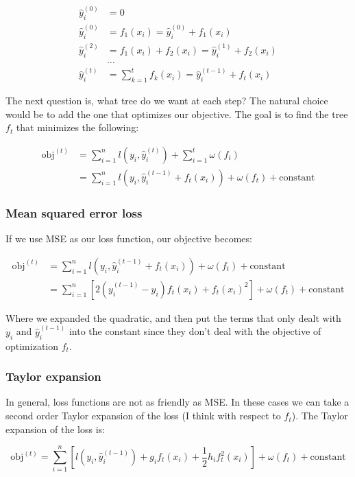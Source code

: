 \documentclass[12 pt, leqno]{article}
\begin{document}
\begin{align*}
\hat{y}^{(0)}_i &= 0 \\
\hat{y}^{(0)}_i &= f_1(x_i) = \hat{y}^{(0)}_i + f_1(x_i) \\
\hat{y}^{(2)}_i &= f_1(x_i) + f_2(x_i) = \hat{y}^{(1)}_i + f_2(x_i) \\
& \dots \\ 
\hat{y}^{(t)}_i &= \sum_{k = 1}^t f_k(x_i)  = \hat{y}^{(t - 1)}_i + f_t(x_i)
\end{align*}

The next question is, what tree do we want at each step? The natural choice would be to add the one that optimizes our objective. The goal is to find the tree $f_t$ that minimizes the following:

\begin{align*}
\text{obj}^{(t)} &= \sum_{i = 1} ^n l(y_i, \hat{y}^{(t)}_i) + \sum_{i = 1}^t \omega(f_i) \\ 
&= \sum_{i = 1} ^n l(y_i, \hat{y}^{(t-1)}_i + f_t(x_i)) + \omega(f_t) + \text{constant} 
\end{align*}

\subsubsection{Mean squared error loss}

If we use MSE as our loss function, our objective becomes:

\begin{align*}
\text{obj}^{(t)} &= \sum_{i = 1} ^n l(y_i, \hat{y}^{(t-1)}_i + f_t(x_i)) + \omega(f_t) + \text{constant} \\
&= \sum_{i = 1}^n [ 2(y_i^{(t-1)} - y_i) f_t (x_i) + f_t (x_i)^2 ] + \omega(f_t) + \text{constant}
\end{align*}

Where we expanded the quadratic, and then put the terms that only dealt with $y_i$ and $\hat{y}_i^{(t-1)}$ into the constant since they don't deal with the objective of optimization $f_t$.

\subsubsection{Taylor expansion}

In general, loss functions are not as friendly as MSE. In these cases we can take a second order Taylor expansion of the loss (I think with respect to $f_t$). The Taylor expansion of the loss is:

$$ \text{obj}^{(t)} = \sum_{i = 1}^n [l(y_i, \hat{y}_i^{(t - 1)}) + g_i f_t (x_i) + \frac{1}{2} h_i f_t^2 (x_i) ] + \omega(f_t) + \text{constant} $$
\end{document}
